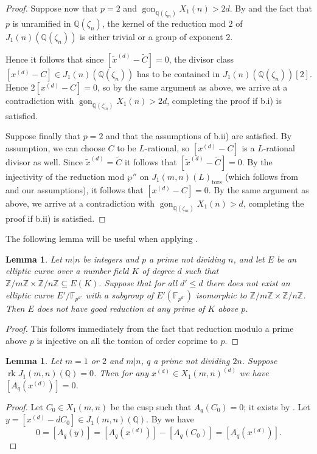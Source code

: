 \documentclass[11pt,reqno]{amsart}
\DeclareMathOperator{\rk}{rk}
\DeclareMathOperator{\gon}{gon}
\newtheorem{lemma}[theorem]{Lemma}
\theoremstyle{definition}
\numberwithin{equation}{section}
\newcommand{\Q}{\mathbb{Q}}
\newcommand{\F}{\mathbb{F}}
\newcommand{\tor}{\mathrm{tors}}
\def\tg#1#2{\mathbb Z/#1\mathbb Z \times \mathbb Z /#2 \mathbb Z}
\begin{document}
\begin{proof}
    
    
    Suppose now that $p=2$ and $\gon_{\Q(\zeta_m)} X_1(n)> 2d$. By \cite[Prop 2.4]{Parent00} and the fact that $p$ is unramified in $\Q(\zeta_n)$, the kernel of the reduction mod $2$ of $J_1(n)(\Q(\zeta_n))$ is either trivial or a group of exponent $2$.
    
 Hence it follows that since $[\tilde{x}^{(d)} - \widetilde{C}]=0$, the divisor class $[x^{(d)}-C]\in J_1(n)(\Q(\zeta_n))$ has to be contained in $J_1(n)(\Q(\zeta_n))[2]$. Hence $2[x^{(d)}-C]=0$, so by the same argument as above, we arrive at a contradiction with $\gon_{\Q(\zeta_m)} X_1(n)> 2d$, completing the proof if b.i)  is satisfied.

    Suppose finally that $p=2$ and that the assumptions of b.ii) are satisfied. By assumption, we can choose $C$ to be $L$-rational, so $[x^{(d)}- C]$ is a $L$-rational divisor as well. Since $\tilde{x}^{(d)}=\widetilde C$ it follows that $[\tilde{x}^{(d)}-\widetilde C]=0$. By the injectivity of the reduction mod $\wp''$ on $J_1(m,n)(L)_\tor$ (which follows from \cite[Appendix]{katz81} and our assumptions), it follows that  $[x^{(d)}- C]=0$. By the same argument as above, we arrive at a contradiction with $\gon_{\Q(\zeta_m)} X_1(n)> d$, completing the proof if b.ii) is satisfied.    
\end{proof}

The following lemma will be useful when applying .
\begin{lemma}\label{lem:main}
Let $m|n$ be integers and $p$ a prime not dividing $n$, and let $E$ be an elliptic curve over a number field $K$ of degree $d$ such that $\tg{m}{n}\subseteq E(K)$. Suppose that for all $d'\leq d$ there does not exist an elliptic curve $E'/\F_{p^{d'}}$ with a subgroup of $E'(\F_{p^{d'}})$ isomorphic to $\tg{m}{n}$. Then $E$ does not have good reduction at any prime of $K$ above $p$.
\end{lemma}
\begin{proof}
    This follows immediately from the fact that reduction modulo a prime above $p$ is injective on all the torsion of order coprime to $p$.
\end{proof}




\begin{lemma}\label{lem:cusp_action}
Let $m=1$ or $2$ and $m|n$, $q$ a prime not dividing $2n$. Suppose $\rk J_1(m,n)(\Q)=0$. 
Then for any $x^{(d)}\in X_1(m,n)^{(d)}$ we have $[A_q(x^{(d)})]=0$.
\end{lemma}
\begin{proof}
    Let $C_0\in X_1(m,n)$ be the cusp such that $A_q(C_0)=0$; it exists by . Let $y=[x^{(d)}-dC_0]\in J_1(m,n)(\Q)$. By  we have 
    $$0=[A_q(y)]=[A_q(x^{(d)})]-[A_q(C_0)]=[A_q(x^{(d)})].$$
\end{proof}
\end{document}
